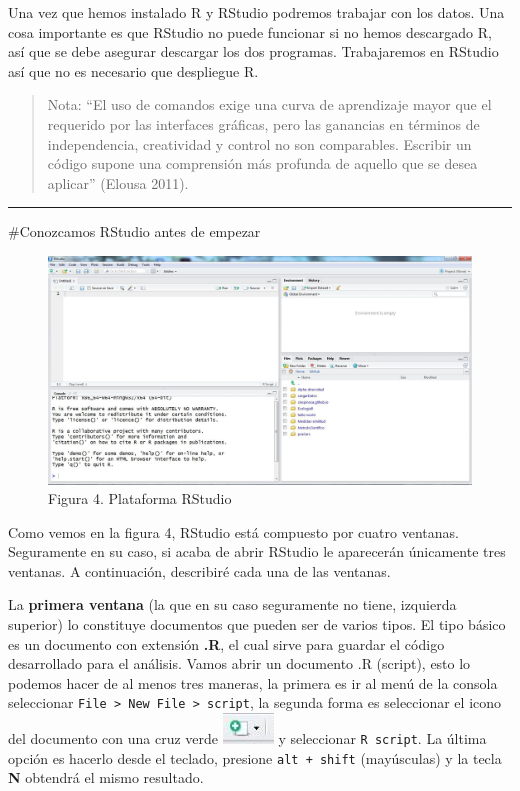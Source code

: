 \documentclass[
]{article}
\begin{document}
Una vez que hemos instalado R y RStudio podremos trabajar con los datos.
Una cosa importante es que RStudio no puede funcionar si no hemos
descargado R, así que se debe asegurar descargar los dos programas.
Trabajaremos en RStudio así que no es necesario que despliegue R.

\begin{quote}
Nota: ``El uso de comandos exige una curva de aprendizaje mayor que el
requerido por las interfaces gráficas, pero las ganancias en términos de
independencia, creatividad y control no son comparables. Escribir un
código supone una comprensión más profunda de aquello que se desea
aplicar'' (Elousa 2011).
\end{quote}

\begin{center}\rule{0.5\linewidth}{0.5pt}\end{center}

\#Conozcamos RStudio antes de empezar

\begin{figure}
\centering
\includegraphics{imagen/RStudio.jpg}
\caption{Figura 4. Plataforma RStudio}
\end{figure}

Como vemos en la figura 4, RStudio está compuesto por cuatro ventanas.
Seguramente en su caso, si acaba de abrir RStudio le aparecerán
únicamente tres ventanas. A continuación, describiré cada una de las
ventanas.

La \textbf{primera ventana} (la que en su caso seguramente no tiene,
izquierda superior) lo constituye documentos que pueden ser de varios
tipos. El tipo básico es un documento con extensión \textbf{.R}, el cual
sirve para guardar el código desarrollado para el análisis. Vamos abrir
un documento .R (script), esto lo podemos hacer de al menos tres
maneras, la primera es ir al menú de la consola seleccionar
\texttt{File\ \textgreater{}\ New\ File\ \textgreater{}\ script}, la
segunda forma es seleccionar el icono del documento con una cruz verde
\includegraphics{imagen/RStudio_nuevo.jpg} y seleccionar
\texttt{R\ script}. La última opción es hacerlo desde el teclado,
presione \texttt{alt\ +\ shift} (mayúsculas) y la tecla \textbf{N}
obtendrá el mismo resultado.
\end{document}
